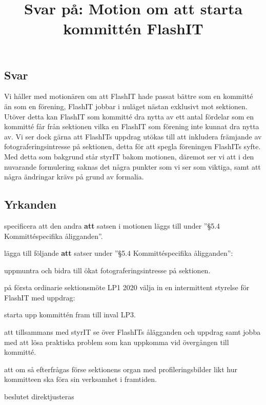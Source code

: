 \documentclass[11pt, noincludeaddress, nopagination]{classes/cthit}
\begin{document}
\title{Svar på: Motion om att starta kommittén FlashIT}

\makeheadfoot%

\makesimpletitle

\subsection*{Svar}
Vi håller med motionären om att FlashIT hade passat bättre som en kommitté än som en förening, FlashIT jobbar i nuläget nästan exklusivt mot sektionen. 
Utöver detta kan FlashIT som kommitté dra nytta av ett antal fördelar som en kommitté får från sektionen vilka en FlashIT som förening inte kunnat dra nytta av. 
Vi ser dock gärna att FlashITs uppdrag utökas till att inkludera främjande av fotograferingsintresse på sektionen, detta för att spegla föreningen FlashITs syfte.
Med detta som bakgrund står styrIT bakom motionen, däremot ser vi att i den nuvarande formulering saknas det några punkter som vi ser som viktiga, samt att några ändringar krävs på grund av formalia. 

\subsection*{Yrkanden}

\begin{att} 
\item specificera att den andra \textbf{att} satsen i motionen läggs till under ''§5.4 Kommittéspecifika åligganden''.
\item lägga till följande \textbf{att} satser under ''§5.4 Kommittéspecifika åligganden'':
\begin{att}
\item uppmuntra och bidra till ökat fotograferingsintresse på sektionen. 
\end{att}
\item på första ordinarie sektionsmöte LP1 2020 välja in en intermittent styrelse för FlashIT med uppdrag:
\begin{att}
\item starta upp kommittén fram till inval LP3.
\item att tillsammans med styrIT se över FlashITs ålägganden och uppdrag samt jobba med att lösa praktiska problem som kan uppkomma vid övergången till kommitté.
\item att om så efterfrågas förse sektionens organ med profileringsbilder likt hur kommitteen ska föra sin verksamhet i framtiden.
\end{att}
\item beslutet direktjusteras
\end{att}
\end{document}
